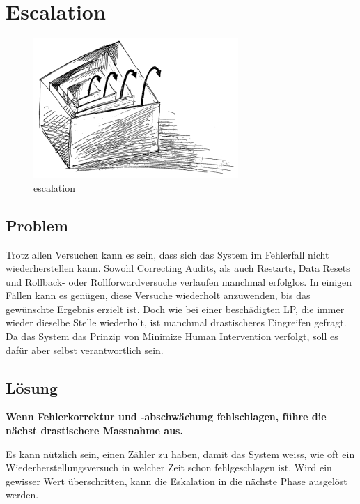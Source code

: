 \section{Escalation}

\begin{figure}[H]
	\centering
	\includegraphics[width=\textwidth]{content/faulttolerance/images/escalation.png}
	\caption{escalation}
\end{figure}

\subsection{Problem}

Trotz allen Versuchen kann es sein, dass sich das System im Fehlerfall nicht wiederherstellen kann. Sowohl Correcting Audits, als auch Restarts, Data Resets und Rollback- oder Rollforwardversuche verlaufen manchmal erfolglos. In einigen Fällen kann es genügen, diese Versuche wiederholt anzuwenden, bis das gewünschte Ergebnis erzielt ist. Doch wie bei einer beschädigten LP, die immer wieder dieselbe Stelle wiederholt, ist manchmal drastischeres Eingreifen gefragt. Da das System das Prinzip von Minimize Human Intervention verfolgt, soll es dafür aber selbst verantwortlich sein.

\subsection{Lösung}

\textbf{\textbf{Wenn Fehlerkorrektur und -abschwächung fehlschlagen, führe die nächst drastischere Massnahme aus.}}

Es kann nützlich sein, einen Zähler zu haben, damit das System weiss, wie oft ein Wiederherstellungsversuch in welcher Zeit schon fehlgeschlagen ist. Wird ein gewisser Wert überschritten, kann die Eskalation in die nächste Phase ausgelöst werden.

